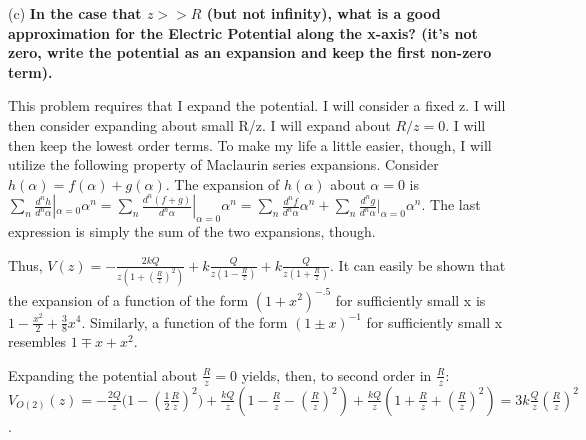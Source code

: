 \begin{homeworkProblem}
\begin{homeworkSection}{(c)}
\textbf{In the case that $z>>R$ (but not infinity), what is a good approximation for the Electric 
Potential along the x-axis? (it's not zero, write the potential as an expansion and keep 
the first non-zero term).}
\\ \par
This problem requires that I expand the potential. I will consider a fixed z. I will then consider expanding about small R/z. I will expand about $R/z = 0$. I will then keep the lowest order terms. To make my life a little easier, though, I will utilize the following property of Maclaurin series expansions. Consider $h(\alpha) = f(\alpha) + g(\alpha)$. The expansion of $h(\alpha)$ about $\alpha = 0$ is $\sum_n \frac{d^n h}{d^n \alpha}|_{\alpha = 0} \alpha^n = \sum_n \frac{d^n (f+g)}{d^n \alpha}|_{\alpha = 0} \alpha^n = \sum_n \frac{d^n f}{d^n \alpha} \alpha^n + \sum_n \frac{d^n g}{d^n \alpha}|_{\alpha = 0} \alpha^n$. The last expression is simply the sum of the two expansions, though.
\\ \par
Thus, $V(z) = -\frac{2kQ}{z(1+(\frac{R}{z})^2)} + k \frac{Q}{z(1-\frac{R}{z})} + k\frac{Q}{z(1+\frac{R}{z})}$. It can easily be shown that the expansion of a function of the form $(1+x^2)^{-.5}$ for sufficiently small x is $1-\frac{x^2}{2}+\frac{3}{8}x^4$. Similarly, a function of the form $(1 \pm x)^{-1}$ for sufficiently small x resembles $1 \mp x + x^2$.
\\ \par
Expanding the potential about $\frac{R}{z} = 0$ yields, then, to second order in $\frac{R}{z}$: $V_{O(2)}(z) = -\frac{2Q}{z}\big(1-(\frac{1}{2}\frac{R}{z})^2\big)+\frac{kQ}{z}(1-\frac{R}{z}-(\frac{R}{z})^2)+\frac{kQ}{z}(1+\frac{R}{z}+(\frac{R}{z})^2)=3k\frac{Q}{z}(\frac{R}{z})^2$.

\end{homeworkSection}

\end{homeworkProblem}
